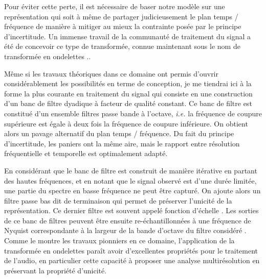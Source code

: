 Pour éviter cette perte, il est nécessaire de baser notre modèle sur une représentation qui soit à même de partager judicieusement le plan temps / fréquence de manière à mitiger au mieux la contrainte posée par le principe d'incertitude. Un immense travail de la communauté de traitement du signal a été de concevoir ce type de transformée, connue maintenant sous le nom de transformée en \og ondelettes \fg.\cite{mallat1989theory}.

Même si les travaux théoriques dans ce domaine ont permis d'ouvrir considérablement les possibilités en terme de conception, je me  tiendrai ici à la forme la plus courante en traitement du signal qui consiste en une construction d'un banc de filtre dyadique à facteur de qualité constant. Ce banc de filtre est constitué d'un ensemble filtres passe bande à l'octave, \textit{i.e.} la fréquence de coupure supérieure est égale à deux fois la fréquence de coupure inférieure. On obtient alors un pavage alternatif du plan temps / fréquence. Du fait du principe d'incertitude, les paniers ont la même aire, mais le rapport entre résolution fréquentielle et temporelle est optimalement adapté.



En considérant que le banc de filtre est construit de manière itérative en partant des hautes fréquences, et en notant que le signal observé est d'une durée limitée, une partie du spectre en basse fréquence ne peut être capturé. On ajoute alors un filtre passe bas dit \og de terminaison \fg qui permet de préserver l'unicité de la représentation. Ce dernier filtre est souvent appelé \og fonction d'échelle \fg. Les sorties de ce banc de filtres peuvent être ensuite re-échantillonnées à une fréquence de Nyquist correspondante à la largeur de la bande d'octave du filtre considéré%
. Comme le montre les travaux pionniers en ce domaine\cite{kronland1987analysis}, l'application de la transformée en ondelettes paraît avoir d'excellentes propriétés pour le traitement de l'audio, en particulier cette capacité à proposer une analyse multirésolution en préservant la propriété d'unicité.


